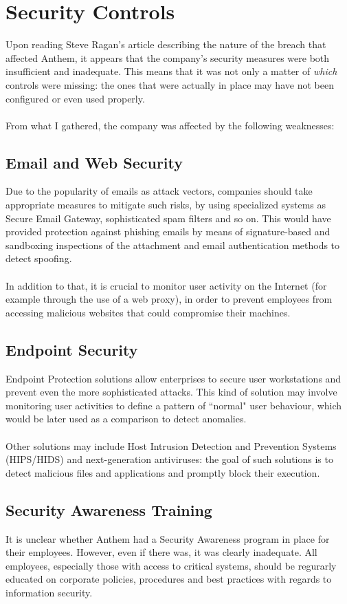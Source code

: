 \section{Security Controls}
	Upon reading Steve Ragan's article \cite{breacharticle} describing the nature of the breach that affected Anthem, it appears that the company's security measures were both insufficient and inadequate. This means that it was not only a matter of \textit{which} controls were missing: the ones that were actually in place may have not been configured or even used properly.\\\\
	From what I gathered, the company was affected by the following weaknesses: 
	\subsection{Email and Web Security}
	Due to the popularity of emails as attack vectors, companies should take appropriate measures to mitigate such risks, by using specialized systems as Secure Email Gateway, sophisticated spam filters and so on. This would have provided protection against phishing emails by means of signature-based and sandboxing inspections of the attachment and email authentication methods to detect spoofing.\\\\In addition to that, it is crucial to monitor user activity on the Internet (for example through the use of a web proxy), in order to prevent employees from accessing malicious websites that could compromise their machines.
	\subsection{Endpoint Security}
	Endpoint Protection solutions allow enterprises to secure user workstations and prevent even the more sophisticated attacks. This kind of solution may involve monitoring user activities to define a pattern of ``normal" user behaviour, which would be later used as a comparison to detect anomalies.\\\\Other solutions may include Host Intrusion Detection and Prevention Systems (HIPS/HIDS) and next-generation antiviruses: the goal of such solutions is to detect malicious files and applications and promptly block their execution.
	\subsection{Security Awareness Training}
	It is unclear whether Anthem had a Security Awareness program in place for their employees. However, even if there was, it was clearly inadequate. All employees, especially those with access to critical systems, should be regurarly educated on corporate policies, procedures and best practices with regards to information security.
